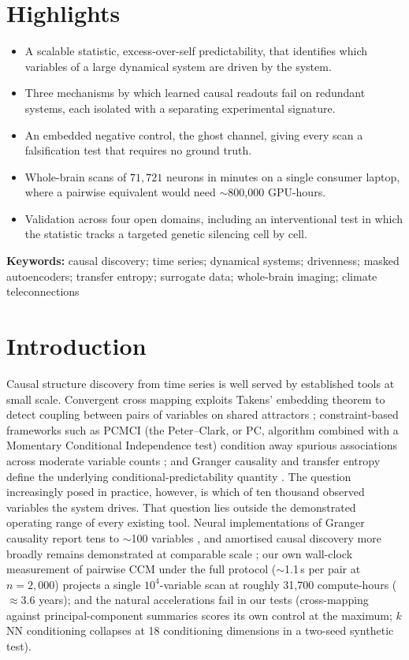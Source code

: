 \documentclass[11pt]{article}
\begin{document}
\section*{Highlights}
\begin{itemize}\setlength{\itemsep}{1pt}
\item A scalable statistic, excess-over-self predictability, that identifies
which variables of a large dynamical system are driven by the system.
\item Three mechanisms by which learned causal readouts fail on redundant
systems, each isolated with a separating experimental signature.
\item An embedded negative control, the ghost channel, giving every scan a
falsification test that requires no ground truth.
\item Whole-brain scans of $71{,}721$ neurons in minutes on a single
consumer laptop, where a pairwise equivalent would need $\sim$800{,}000
GPU-hours.
\item Validation across four open domains, including an interventional test
in which the statistic tracks a targeted genetic silencing cell by cell.
\end{itemize}

\vspace{2pt}
\noindent\textbf{Keywords:} causal discovery; time series; dynamical
systems; drivenness; masked autoencoders; transfer entropy; surrogate data;
whole-brain imaging; climate teleconnections

\section{Introduction}

Causal structure discovery from time series is well served by
established tools at small scale. Convergent cross mapping exploits Takens' embedding theorem to detect
coupling between pairs of variables on shared attractors
\citep{sugihara2012,takens1981,ye2015}; constraint-based frameworks such as PCMCI (the Peter--Clark, or PC,
algorithm combined with a Momentary Conditional Independence test)
condition away spurious associations across moderate variable
counts \citep{runge2019,runge2019nc}; and Granger causality and transfer entropy define the
underlying conditional-predictability quantity
\citep{granger1969,schreiber2000}. The question increasingly posed in practice, however, is which of ten
thousand observed variables the system drives. That question lies outside
the demonstrated operating range of every existing tool. Neural implementations of Granger causality report tens to $\sim$100
variables \citep{tank2021}, and amortised causal discovery more broadly
remains demonstrated at comparable scale \citep{lowe2022}; our own wall-clock measurement of pairwise CCM under the full protocol
($\sim$1.1\,s per pair at $n{=}2{,}000$) projects a single $10^4$-variable scan at roughly 31{,}700
compute-hours ($\approx$3.6 years); and the natural accelerations fail in our tests (cross-mapping against
principal-component summaries scores its own control at the maximum;
$k$NN conditioning \citep{kraskov2004} collapses at 18 conditioning
dimensions in a two-seed synthetic test).
\end{document}
